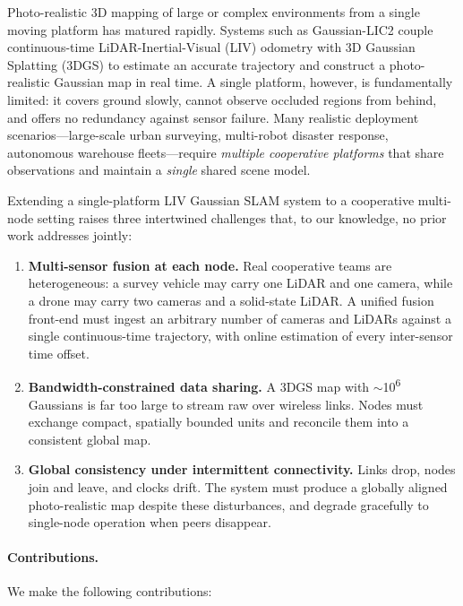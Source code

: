 Photo-realistic 3D mapping of large or complex environments from a single
moving platform has matured rapidly. Systems such as Gaussian-LIC2
\cite{lang2026gaussian2} couple continuous-time LiDAR-Inertial-Visual (LIV)
odometry with 3D Gaussian Splatting (3DGS) \cite{kerbl20233dgs} to estimate an
accurate trajectory and construct a photo-realistic Gaussian map in real time.
A single platform, however, is fundamentally limited: it covers ground slowly,
cannot observe occluded regions from behind, and offers no redundancy against
sensor failure. Many realistic deployment scenarios---large-scale urban
surveying, multi-robot disaster response, autonomous warehouse fleets---require
\emph{multiple cooperative platforms} that share observations and maintain a
\emph{single} shared scene model.

Extending a single-platform LIV Gaussian SLAM system to a cooperative multi-node
setting raises three intertwined challenges that, to our knowledge, no prior
work addresses jointly:

\begin{enumerate}
  \item \textbf{Multi-sensor fusion at each node.} Real cooperative teams are
    heterogeneous: a survey vehicle may carry one LiDAR and one camera, while a
    drone may carry two cameras and a solid-state LiDAR. A unified fusion
    front-end must ingest an arbitrary number of cameras and LiDARs against a
    single continuous-time trajectory, with online estimation of every
    inter-sensor time offset.
  \item \textbf{Bandwidth-constrained data sharing.} A 3DGS map with
    $\sim$10\textsuperscript{6} Gaussians is far too large to stream raw over
    wireless links. Nodes must exchange compact, spatially bounded units and
    reconcile them into a consistent global map.
  \item \textbf{Global consistency under intermittent connectivity.} Links drop,
    nodes join and leave, and clocks drift. The system must produce a globally
    aligned photo-realistic map despite these disturbances, and degrade
    gracefully to single-node operation when peers disappear.
\end{enumerate}

\paragraph{Contributions.} We make the following contributions:

